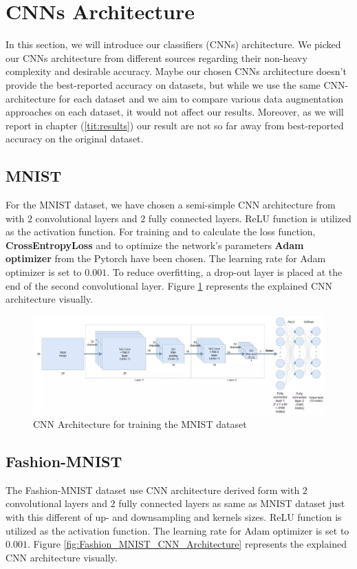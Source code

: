 \section{CNNs Architecture}
In this section, we will introduce our classifiers (CNNs) architecture. We picked our CNNs architecture from
different sources regarding their non-heavy complexity and desirable accuracy.  Maybe our chosen
CNNs architecture doesn't provide the best-reported accuracy on datasets, but while we use the
same CNN-architecture for each dataset and we aim to compare various data augmentation approaches on
each dataset, it would not affect our results. Moreover, as we will report in chapter (\ref{tit:results})
our result are not so far away from best-reported accuracy on the original dataset.

\subsection{MNIST}
For the MNIST dataset, we have chosen a semi-simple CNN architecture from \cite{MNIST_CNN_Architecture} with $2$
convolutional layers and $2$ fully connected layers. ReLU function is utilized as the activation
function. For training and to calculate the loss function, \textbf{CrossEntropyLoss} and
to optimize the network's parameters \textbf{Adam optimizer} \cite{adam-optimizer} from the Pytorch have been
chosen. The learning rate for Adam optimizer is set to $0.001$. To reduce overfitting, a
drop-out layer is placed at the end of the second convolutional layer. Figure \ref{fig:MNIST_CNN_Architecture} represents the explained CNN architecture visually.

\begin{figure}
  \centering
  \label{fig:MNIST_CNN_Architecture}
  \includegraphics[width=1\textwidth]{fig/MNIST-CNN-Architecture}
  \caption{CNN Architecture for training the MNIST dataset \cite{MNIST_CNN_Architecture_Image}}
\end{figure}


\subsection{Fashion-MNIST}
The Fashion-MNIST dataset use CNN architecture derived form \cite{TODO} with $2$
convolutional layers and $2$ fully connected layers as same as MNIST dataset just with this
different of up- and downsampling and kernels sizes. ReLU function is utilized as the activation
function. The learning rate for Adam optimizer is set to $0.001$. Figure \ref{fig:Fashion_MNIST_CNN_Architecture} represents the explained CNN architecture visually.


